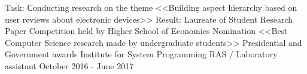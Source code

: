 \begin{cventries}
\cventry
{Task: Сonducting research on the theme <<Building aspect hierarchy based on user reviews about electronic devices>>
		\newline Result: Laureate of Student Research Paper Competition held by Higher School of Economics
		\newline Nomination <<Best Computer Science research made by undergraduate students>>
		\newline Presidential and Government awards
		\newline
	} %
{Institute for System Programming RAS / Laboratory assistant} %
{} %
{October 2016 - June 2017} %
\noindent	



\end{cventries}